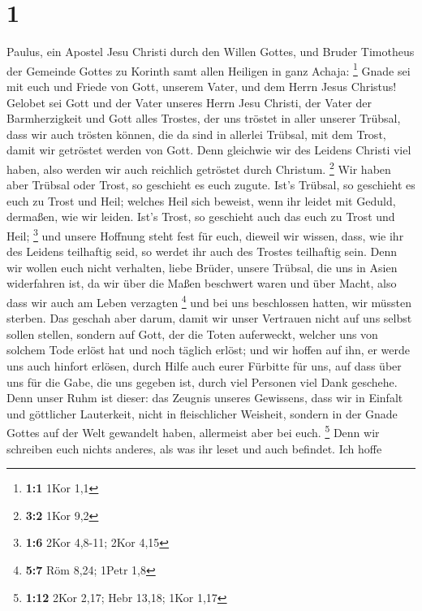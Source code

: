 \hypertarget{section}{%
\section{1}\label{section}}

 Paulus, ein Apostel Jesu Christi durch den Willen Gottes,
und Bruder Timotheus der Gemeinde Gottes zu Korinth samt allen Heiligen
in ganz Achaja: \footnote{\textbf{1:1} 1Kor 1,1}  Gnade
sei mit euch und Friede von Gott, unserem Vater, und dem Herrn Jesus
Christus!  Gelobet sei Gott und der Vater unseres Herrn
Jesu Christi, der Vater der Barmherzigkeit und Gott alles Trostes,
 der uns tröstet in aller unserer Trübsal, dass wir auch
trösten können, die da sind in allerlei Trübsal, mit dem Trost, damit
wir getröstet werden von Gott.  Denn gleichwie wir des
Leidens Christi viel haben, also werden wir auch reichlich getröstet
durch Christum. \footnote{\textbf{3:2} 1Kor 9,2}  Wir
haben aber Trübsal oder Trost, so geschieht es euch zugute. Ist's
Trübsal, so geschieht es euch zu Trost und Heil; welches Heil sich
beweist, wenn ihr leidet mit Geduld, dermaßen, wie wir leiden. Ist's
Trost, so geschieht auch das euch zu Trost und Heil; \footnote{\textbf{1:6}
  2Kor 4,8-11; 2Kor 4,15}  und unsere Hoffnung steht fest
für euch, dieweil wir wissen, dass, wie ihr des Leidens teilhaftig seid,
so werdet ihr auch des Trostes teilhaftig sein.  Denn wir
wollen euch nicht verhalten, liebe Brüder, unsere Trübsal, die uns in
Asien widerfahren ist, da wir über die Maßen beschwert waren und über
Macht, also dass wir auch am Leben verzagten \footnote{\textbf{5:7} Röm
  8,24; 1Petr 1,8}  und bei uns beschlossen hatten, wir
müssten sterben. Das geschah aber darum, damit wir unser Vertrauen nicht
auf uns selbst sollen stellen, sondern auf Gott, der die Toten
auferweckt,  welcher uns von solchem Tode erlöst hat und
noch täglich erlöst; und wir hoffen auf ihn, er werde uns auch hinfort
erlösen,  durch Hilfe auch eurer Fürbitte für uns, auf
dass über uns für die Gabe, die uns gegeben ist, durch viel Personen
viel Dank geschehe.  Denn unser Ruhm ist dieser: das
Zeugnis unseres Gewissens, dass wir in Einfalt und göttlicher
Lauterkeit, nicht in fleischlicher Weisheit, sondern in der Gnade Gottes
auf der Welt gewandelt haben, allermeist aber bei euch. \footnote{\textbf{1:12}
  2Kor 2,17; Hebr 13,18; 1Kor 1,17}  Denn wir schreiben
euch nichts anderes, als was ihr leset und auch befindet. Ich hoffe
